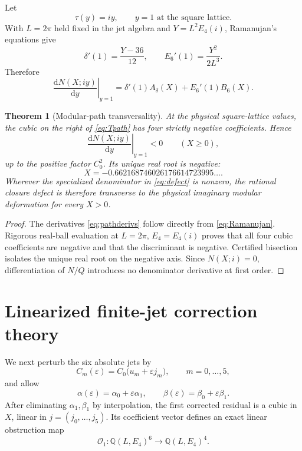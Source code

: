 \documentclass[11pt]{article}
\newtheorem{theorem}{Theorem}[section]
\theoremstyle{definition}
\theoremstyle{remark}
\newcommand{\dd}{\mathrm{d}}
\newcommand{\Q}{\mathbb{Q}}
\newcommand{\cO}{\mathcal{O}}
\begin{document}
Let
\[
 \tau(y)=iy,
 \qquad y=1\text{ at the square lattice}.
\]
With \(L=2\pi\) held fixed in the jet algebra and \(Y=L^2E_4(i)\), Ramanujan's equations give
\begin{equation}\label{eq:pathderivs}
 \delta'(1)=\frac{Y-36}{12},
 \qquad
 E_6'(1)=\frac{Y^2}{2L^3}.
\end{equation}
Therefore
\begin{equation}\label{eq:Tpath}
 \left.\frac{\dd N(X;iy)}{\dd y}\right|_{y=1}
 =\delta'(1)A_\delta(X)+E_6'(1)B_6(X).
\end{equation}

\begin{theorem}[Modular-path transversality]\label{thm:path}
At the physical square-lattice values, the cubic on the right of \eqref{eq:Tpath} has four strictly negative coefficients.  Hence
\begin{equation}\label{eq:pathnegative}
 \left.\frac{\dd N(X;iy)}{\dd y}\right|_{y=1}<0
 \qquad(X\ge0),
\end{equation}
up to the positive factor \(C_0^2\).  Its unique real root is negative:
\[
 X=-0.662168746026176614723995\ldots.
\]
Wherever the specialized denominator in \eqref{eq:defect} is nonzero, the rational closure defect is therefore transverse to the physical imaginary modular deformation for every \(X>0\).
\end{theorem}

\begin{proof}
The derivatives \eqref{eq:pathderivs} follow directly from \eqref{eq:Ramanujan}.  Rigorous real-ball evaluation at \(L=2\pi\), \(E_4=E_4(i)\) proves that all four cubic coefficients are negative and that the discriminant is negative.  Certified bisection isolates the unique real root on the negative axis.  Since \(N(X;i)=0\), differentiation of \(N/Q\) introduces no denominator derivative at first order.
\end{proof}

\section{Linearized finite-jet correction theory}

We next perturb the six absolute jets by
\begin{equation}\label{eq:jetperturb}
 C_m(\varepsilon)=C_0\bigl(u_m+\varepsilon j_m\bigr),
 \qquad m=0,\ldots,5,
\end{equation}
and allow
\begin{equation}\label{eq:abperturb}
 \alpha(\varepsilon)=\alpha_0+\varepsilon\alpha_1,
 \qquad
 \beta(\varepsilon)=\beta_0+\varepsilon\beta_1.
\end{equation}
After eliminating \(\alpha_1,\beta_1\) by interpolation, the first corrected residual is a cubic in \(X\), linear in \(j=(j_0,\ldots,j_5)\).  Its coefficient vector defines an exact linear obstruction map
\begin{equation}\label{eq:O1}
 \cO_1:\Q(L,E_4)^6\longrightarrow\Q(L,E_4)^4.
\end{equation}
\end{document}
